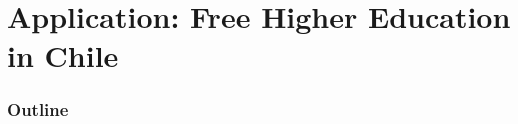 \documentclass[usenames,dvipsnames,11pt,aspectratio=169]{beamer}
\begin{document}
%
%
%
%
%
%
%
%
%
%
%
%
%
%


\section{Application: Free Higher Education in Chile}

\begin{frame}
\frametitle{Outline}
\tableofcontents[currentsection]
\end{frame}
\end{document}
